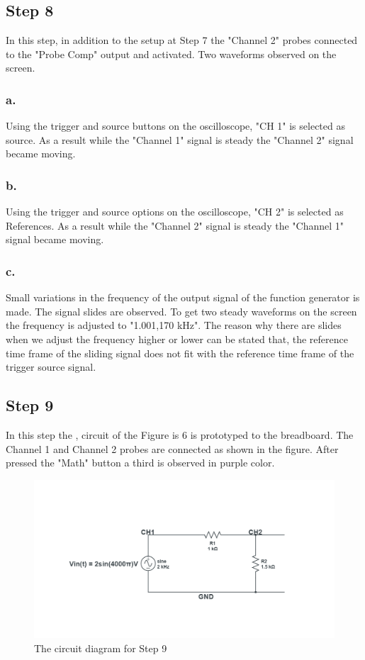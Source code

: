 \documentclass[letterpaper,12pt]{article}
\begin{document}
\subsection{Step 8}
In this step, in addition to the setup at Step 7 the "Channel 2" probes connected to the "Probe Comp" output and activated. Two waveforms observed on the screen.
\subsubsection{a.}
Using the trigger and source buttons on the oscilloscope, "CH 1" is selected as source. As a result while the "Channel 1" signal is steady the "Channel 2" signal became moving. 
\subsubsection{b.}
Using the trigger and source options on the oscilloscope, "CH 2" is selected as References. As a result while the "Channel 2" signal is steady the "Channel 1" signal became moving. 
\subsubsection{c.}
Small variations in the frequency of the output signal of the function generator is made. The signal slides are observed. To get two steady waveforms on the screen the frequency is adjusted to "1.001,170 kHz". The reason why there are slides when we adjust the frequency higher or lower can be stated that,  the reference time frame of the sliding signal does not fit with the reference time frame of the trigger source signal.

\subsection{Step 9}
In this step the , circuit of the Figure is 6 is prototyped to the breadboard. The Channel 1 and Channel 2 probes are connected  as shown in the figure. After pressed the "Math" button a third is observed in purple color. 
\begin{figure}[h]
	\caption{ The circuit diagram for Step 9  }
	\centering
	\includegraphics[width=1\textwidth]{9circuit.png}
\end{figure}
\end{document}
